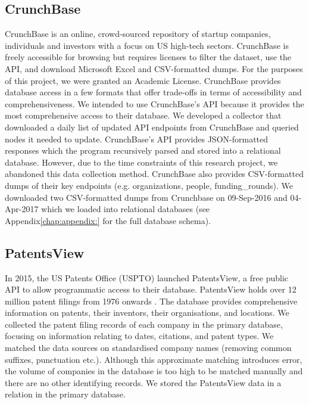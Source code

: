 \documentclass[../thesis/thesis.tex]{subfiles}
\begin{document}
\subsection{CrunchBase}

CrunchBase is an online, crowd-sourced repository of startup companies, individuals and investors with a focus on US high-tech sectors. CrunchBase is freely accessible for browsing but requires licenses to filter the dataset, use the API, and download Microsoft Excel and CSV-formatted dumps. For the purposes of this project, we were granted an Academic License. CrunchBase provides database access in a few formats that offer trade-offs in terms of accessibility and comprehensiveness. We intended to use CrunchBase’s API because it provides the most comprehensive access to their database. We developed a collector that downloaded a daily list of updated API endpoints from CrunchBase and queried nodes it needed to update. CrunchBase’s API provides JSON-formatted responses which the program recursively parsed and stored into a relational database. However, due to the time constraints of this research project, we abandoned this data collection method. CrunchBase also provides CSV-formatted dumps of their key endpoints (e.g. organizations, people, funding_rounds). We downloaded two CSV-formatted dumps from Crunchbase on 09-Sep-2016 and 04-Apr-2017 which we loaded into relational databases (see Appendix\ref{chap:appendix:} for the full database schema).

\subsection{PatentsView}

In 2015, the US Patents Office (USPTO) launched PatentsView, a free public API to allow programmatic access to their database. PatentsView holds over 12 million patent filings from 1976 onwards \cite{schultz2016}. The database provides comprehensive information on patents, their inventors, their organisations, and locations. We collected the patent filing records of each company in the primary database, focusing on information relating to dates, citations, and patent types. We matched the data sources on standardised company names (removing common suffixes, punctuation etc.). Although this approximate matching introduces error, the volume of companies in the database is too high to be matched manually and there are no other identifying records. We stored the PatentsView data in a relation in the primary database.
\end{document}
